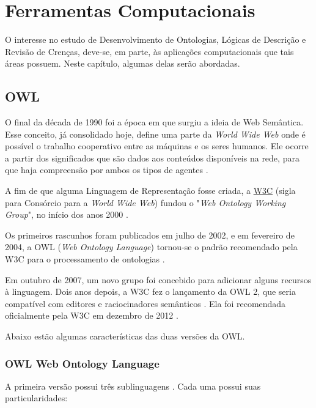 \chapter{Ferramentas Computacionais}
\label{chap:ferramentas}

\lettrine{O}{} interesse no estudo de Desenvolvimento de Ontologias, Lógicas de Descrição e Revisão de Crenças, deve-se, em parte, às aplicações computacionais que tais áreas possuem. Neste capítulo, algumas delas serão abordadas.

\section{OWL}

O final da década de 1990 foi a época em que surgiu a ideia de Web Semântica. Esse conceito, já consolidado hoje, define uma parte da \textit{World Wide Web} onde é possível o trabalho cooperativo entre as máquinas e os seres humanos. Ele ocorre a partir dos significados que são dados aos conteúdos disponíveis na rede, para que haja compreensão por ambos os tipos de agentes \citep{ferramentasHerman}.

A fim de que alguma Linguagem de Representação fosse criada, a \href{https://www.w3.org}{W3C} (sigla para Consórcio para a \textit{World Wide Web}) fundou o "\textit{Web Ontology Working Group}", no início dos anos 2000  \citep{ferramentasGrupo}. 

Os primeiros rascunhos foram publicados em julho de 2002, e em fevereiro de 2004, a OWL (\textit{Web Ontology Language}) tornou-se o padrão recomendado pela W3C para o processamento de ontologias \citep{ferramentasReco}.

Em outubro de 2007, um novo grupo foi concebido para adicionar alguns recursos à linguagem. Dois anos depois, a W3C fez o lançamento da OWL 2, que seria compatível com editores e raciocinadores semânticos \citep{ferramentasOWLGrupo2}. Ela foi recomendada oficialmente pela W3C em dezembro de 2012 \citep{ferramentasOWLReco2}.

Abaixo estão algumas características das duas versões da OWL.

\subsection{OWL Web Ontology Language}

A primeira versão possui três sublinguagens \citep{ferramentasOWL1}. Cada uma possui suas particularidades:

